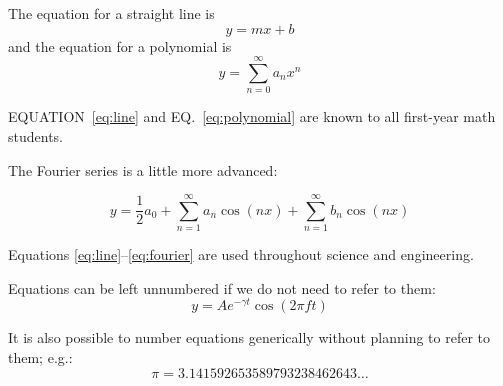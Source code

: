 \providecommand{\crefformat}[2]{}
\providecommand{\Crefformat}[2]{}
\crefformat{equation}{EQ.~#2#1#3}
\Crefformat{equation}{EQUATION~#2#1#3}

\providecommand{\plusnamesingular}{}
\providecommand{\starnamesingular}{}
\providecommand{\cref}{\plusnamesingular~\ref}
\providecommand{\Cref}{\starnamesingular~\ref}

The equation for a straight line is
\begin{equation} y = mx + b \label{eq:line}\end{equation} and the
equation for a polynomial is
\begin{equation} y = \sum_{n=0}^{\infty} a_n x^n \label{eq:polynomial}\end{equation}

\protect\renewcommand{\starnamesingular}{EQUATION}\Cref{eq:line} and
\protect\renewcommand{\plusnamesingular}{EQ.}\cref{eq:polynomial} are
known to all first-year math students.

The Fourier series is a little more advanced:

\begin{equation} y = \frac{1}{2}a_0 + \sum_{n=1}^{\infty}a_n\cos(nx)
                      + \sum_{n=1}^{\infty}b_n\cos(nx)
\label{eq:fourier}\end{equation}

Equations \ref{eq:line}--\ref{eq:fourier} are used throughout science
and engineering.

Equations can be left unnumbered if we do not need to refer to them:
\[ y = A e^{-\gamma t}\cos(2\pi f t) \]

It is also possible to number equations generically without planning to
refer to them; e.g.:
\begin{equation} \pi = 3.141592653589793238462643\dots \label{eq:d8713f25-dcbf-40c7-980e-e5d256f91b61}\end{equation}

